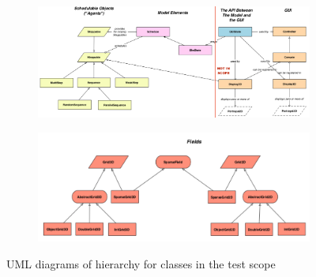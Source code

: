 \documentclass[11pt]{article}
\begin{document}
\begin{figure}[htp]
\begin{subfigure}[b]{\textwidth}
\includegraphics[width=\textwidth]{Appendix/UML}
\end{subfigure}
\begin{subfigure}[b]{\textwidth}
\includegraphics[width=\textwidth]{Appendix/UML_fields}
\end{subfigure}
\caption{UML diagrams of hierarchy for classes in the test scope\cite{mason_uml}}
\label{fig:uml}
\end{figure}
\end{document}
